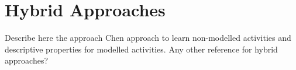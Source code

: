 \section{Hybrid Approaches}
\label{sec:soa:hybrid}

Describe here the approach Chen approach to learn non-modelled activities and descriptive properties for modelled activities. Any other reference for hybrid approaches?